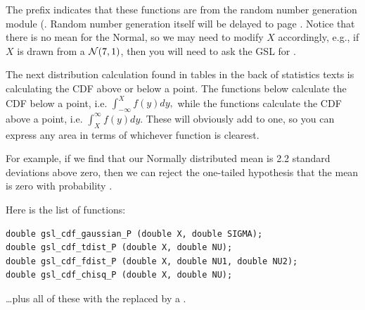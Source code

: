 The prefix  indicates that these
functions are from the random number generation module
(. Random number generation itself will be
delayed to page \pageref{randomnumbers}. Notice that there is no mean
for the Normal, so we may need to modify $X$ accordingly, e.g., if $X$
is drawn from a ${\cal N}(7,1)$, then you will need to ask the GSL for 
.


The next distribution calculation found in tables in the back of
statistics texts is calculating the CDF above or below a point. 
The functions below calculate the CDF below a point, i.e.
$\int_{-\infty}^X f(y) dy,$
while the functions calculate the CDF above a point, i.e.
$\int^{\infty}_X f(y) dy.$
These will obviously add to one, so you can express any area in terms of whichever function is clearest.

For example, if we find that our Normally distributed mean is 2.2 standard
deviations above zero, then we can reject the one-tailed hypothesis that
the mean is zero with probability .

Here is the list of functions:
\begin{lstlisting}
double gsl_cdf_gaussian_P (double X, double SIGMA);
double gsl_cdf_tdist_P (double X, double NU);
double gsl_cdf_fdist_P (double X, double NU1, double NU2);
double gsl_cdf_chisq_P (double X, double NU);
\end{lstlisting}
\dots plus all of these with the  replaced by a .


